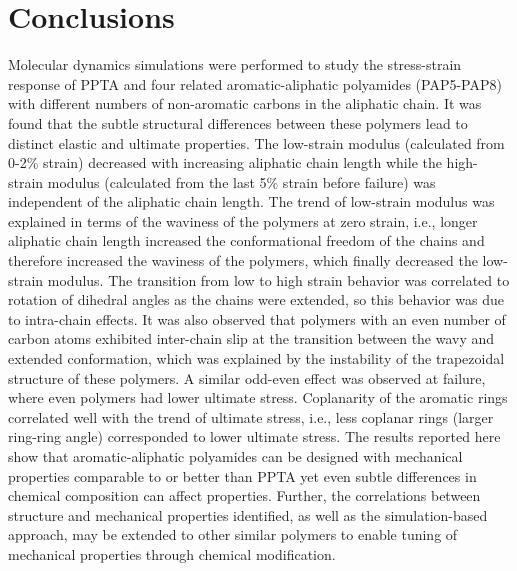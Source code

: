 \documentclass[journal=langd5,manuscript=article]{achemso}
\begin{document}
\section{Conclusions}
Molecular dynamics simulations were performed to study the stress-strain response of PPTA and four related aromatic-aliphatic polyamides (PAP5-PAP8) with different numbers of non-aromatic carbons in the aliphatic chain. 
It was found that the subtle structural differences between these polymers lead to distinct elastic and ultimate properties.
The low-strain modulus (calculated from 0-2\% strain) decreased with increasing aliphatic chain length while the high-strain modulus (calculated from the last 5\% strain before failure) was independent of the aliphatic chain length.
The trend of low-strain modulus was explained in terms of the waviness of the polymers at zero strain, i.e., longer aliphatic chain length increased the conformational freedom of the chains and therefore increased the waviness of the polymers, which finally decreased the low-strain modulus.
The transition from low to high strain behavior was correlated to rotation of dihedral angles as the chains were extended, so this behavior was due to intra-chain effects.
It was also observed that polymers with an even number of carbon atoms
exhibited inter-chain slip at the transition between the wavy and extended conformation, which was explained by the instability of the trapezoidal structure of these polymers.
A similar odd-even effect was observed at failure, where even polymers had lower ultimate stress.
Coplanarity of the aromatic rings correlated well with the trend of ultimate stress, i.e., less coplanar rings (larger ring-ring angle) corresponded to lower ultimate stress.
The results reported here show that aromatic-aliphatic polyamides can be designed with mechanical properties comparable to or better than PPTA yet even subtle differences in chemical composition can affect properties.
Further, the correlations between structure and mechanical properties identified, as well as the simulation-based approach, may be extended to other similar polymers to enable tuning of mechanical properties through chemical modification.
\end{document}
